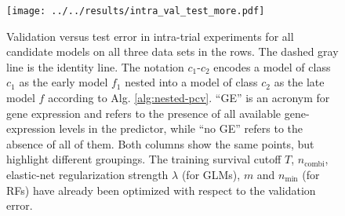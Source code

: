 \begin{figure}
    \centering
    \texttt{[image: ../../results/intra\_val\_test\_more.pdf]}
    \caption{Validation versus test error in intra-trial experiments for all candidate models on 
        all three data sets in the rows. The dashed 
        gray line is the identity line. The notation 
        $c_1$-$c_2$ encodes a model of class $c_1$ as the early model $f_1$ nested into a model of 
        class $c_2$ as the late model $f$ according to Alg. \ref{alg:nested-pcv}.
        ``GE'' is an acronym for gene expression and refers to the presence of all available 
        gene-expression levels in the predictor, while ``no GE'' refers to the absence of all of 
        them. Both columns show 
        the same points, but highlight different groupings. The training survival cutoff $T$, 
        $n_\text{combi}$, elastic-net regularization strength $\lambda$ (for GLMs), 
        $m$ and $n_\text{min}$ (for RFs) have already been optimized with respect to the 
        validation error. }
    \label{fig:intra-val-test-more}
\end{figure}
